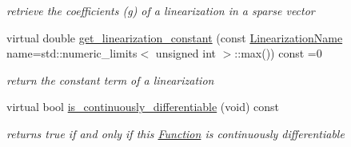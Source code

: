 \begin{Indent}
\begin{DoxyCompactItemize}
\begin{DoxyCompactList}\small\item\em retrieve the coefficients (g) of a linearization in a sparse vector \end{DoxyCompactList}\item 
virtual double \mbox{\hyperlink{class_s_m_spp__di__unipi__it_1_1_c05_function_a3dd9dea6fa3125e0c45acb5fc28955f8}{get\+\_\+linearization\+\_\+constant}} (const \mbox{\hyperlink{class_s_m_spp__di__unipi__it_1_1_c05_function_ae90bf93c6d4b4ada66791c735d1c03cc}{Linearization\+Name}} name=std\+::numeric\+\_\+limits$<$ unsigned int $>$\+::max()) const =0
\begin{DoxyCompactList}\small\item\em return the constant term of a linearization \end{DoxyCompactList}\item 
virtual bool \mbox{\hyperlink{class_s_m_spp__di__unipi__it_1_1_c05_function_ade71194d2205da239374eeeb8ba82b11}{is\+\_\+continuously\+\_\+differentiable}} (void) const
\begin{DoxyCompactList}\small\item\em returns true if and only if this \mbox{\hyperlink{class_s_m_spp__di__unipi__it_1_1_function}{Function}} is continuously differentiable \end{DoxyCompactList}\end{DoxyCompactItemize}
\end{Indent}
